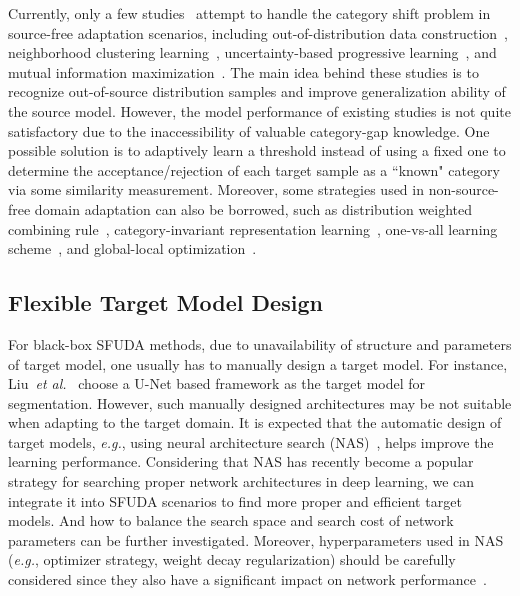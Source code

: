 \documentclass[10pt,journal,compsoc]{IEEEtran}
\def\etal{{\em et al.}}
\def\eg{{\em e.g.}}
\begin{document}
Currently, only a few studies~\cite{kundu2020universal, kundu2020towards, zhao2022source} attempt to handle the category shift problem in source-free adaptation scenarios, including out-of-distribution data construction~\cite{kundu2020universal, kundu2020towards}, neighborhood clustering learning~\cite{saito2020universal}, uncertainty-based progressive learning~\cite{luo2022source}, and mutual information maximization~\cite{liang2021umad}.
The main idea behind these studies is to recognize out-of-source distribution samples and improve generalization ability of the source model.
However, the model performance of existing studies is not quite satisfactory due to the inaccessibility of valuable category-gap knowledge.
One possible solution is to adaptively learn a threshold instead of using a fixed one to determine the acceptance/rejection of each target sample as a ``known" category via some similarity measurement.
Moreover, some strategies used in non-source-free domain adaptation can also be borrowed, such as distribution weighted combining rule~\cite{xu2018deep}, category-invariant representation learning~\cite{lekhtman2021dilbert}, one-vs-all learning scheme~\cite{saito2021ovanet}, and global-local optimization~\cite{feng2021globally}.


\subsection{Flexible Target Model Design}
For black-box SFUDA methods, due to unavailability of structure and parameters of target model, one usually has to manually design a target model.
For instance, Liu~\etal~\cite{liu2022unsupervised1} choose a U-Net based framework as the target model for segmentation.
However, such manually designed architectures may be not suitable when adapting to the target domain.
It is expected that the automatic design of target models, \eg, using neural architecture search (NAS)~\cite{elsken2019neural, wistuba2019survey, lu2021neural}, helps improve the learning performance. %
Considering that NAS has recently become a popular strategy for searching proper network architectures in deep learning, we can integrate it into SFUDA scenarios to find more proper and efficient target models.
And how to balance the search space and search cost of network parameters can be further investigated.
Moreover, hyperparameters used in NAS (\eg, optimizer strategy, weight decay regularization) should be carefully considered since they also have a significant impact on network performance~\cite{ren2021comprehensive}.
\end{document}
